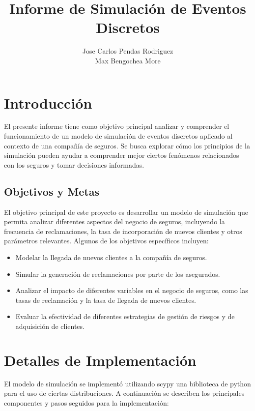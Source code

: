 \documentclass{article}
\title{Informe de Simulación de Eventos Discretos}
\author{Jose Carlos Pendas Rodriguez \\ Max Bengochea More}
\date{}
\begin{document}
\maketitle

\section{Introducción}
El presente informe tiene como objetivo principal analizar y comprender el funcionamiento de un modelo de simulación de eventos discretos aplicado al contexto de una compañía de seguros. Se busca explorar cómo los principios de la simulación pueden ayudar a comprender mejor ciertos fenómenos relacionados con los seguros y tomar decisiones informadas.

\subsection{Objetivos y Metas}
El objetivo principal de este proyecto es desarrollar un modelo de simulación que permita analizar diferentes aspectos del negocio de seguros, incluyendo la frecuencia de reclamaciones, la tasa de incorporación de nuevos clientes y otros parámetros relevantes. Algunos de los objetivos específicos incluyen:

\begin{itemize}
  \item Modelar la llegada de nuevos clientes a la compañía de seguros.
  \item Simular la generación de reclamaciones por parte de los asegurados.
  \item Analizar el impacto de diferentes variables en el negocio de seguros, como las tasas de reclamación y la tasa de llegada de nuevos clientes.
  \item Evaluar la efectividad de diferentes estrategias de gestión de riesgos y de adquisición de clientes.
\end{itemize}

\section{Detalles de Implementación}
El modelo de simulación se implementó utilizando scypy una biblioteca de python para el uso de ciertas distribuciones. A continuación se describen los principales componentes y pasos seguidos para la implementación:
\end{document}
